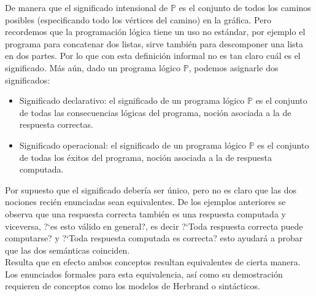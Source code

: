 \documentclass[11pt,letterpaper]{article}
\begin{document}
De manera que el significado intensional de $\mathbb{P}$ es el conjunto de 
todos los caminos posibles (especificando todo los v\'ertices del camino) en la 
gr\'afica. Pero recordemos que la programaci\'on l\'ogica tiene un uso no 
est\'andar, por ejemplo el programa para concatenar dos listas, sirve tambi\'en 
para descomponer una lista en dos partes. Por lo que con esta definici\'on 
informal no es tan claro cu\'al es el significado. M\'as a\'un, dado un 
programa l\'ogico $\mathbb{P}$, podemos asignarle dos significados:
\begin{itemize}
 \item Significado declarativo: 
  el significado de un programa l\'ogico $\mathbb{P}$ es el conjunto de todas 
  las consecuencias l\'ogicas del programa, noci\'on asociada a la de respuesta 
  correctas.
 \item Significado operacional: 
  el significado de un programa l\'ogico $\mathbb{P}$ es el conjunto de todas 
  los \'exitos del programa, noci\'on asociada a la de respuesta computada.
\end{itemize}

Por supuesto que el significado deber\'ia ser \'unico,  pero no es claro que 
las dos nociones reci\'en enunciadas sean equivalentes. De los ejemplos 
anteriores se observa que una respuesta correcta tambi\'en es una respuesta 
computada y viceversa, ?`es esto v\'alido en general?, es decir ?`Toda
respuesta correcta puede computarse? y ?`Toda respuesta computada es
correcta? esto ayudar\'a a probar que las dos sem\'anticas coinciden.  \\
Resulta que en efecto ambos conceptos resultan equivalentes de cierta manera. 
Los enunciados formales para esta equivalencia, as\'i como su demostraci\'on 
requieren de conceptos como los modelos de Herbrand o sint\'acticos.
\end{document}
